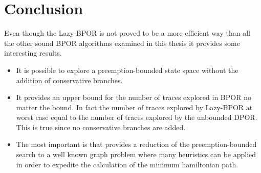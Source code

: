 
\section{Conclusion}
Even though the Lazy-BPOR is not proved to be a more efficient way than all the other sound BPOR algorithms examined in this thesis it
provides some interesting results.

\begin{itemize}
    \item It is possible to explore a preemption-bounded state space without the addition of conservative branches.
    \item It provides an upper bound for the number of traces explored in BPOR no matter the bound. In fact the number of traces
    explored by Lazy-BPOR at worst case equal to the number of traces explored by the unbounded DPOR. This is true since no conservative
    branches are added.
    \item The most important is that provides a reduction of the preemption-bounded search to a well known graph problem where many heuristics can
    be applied in order to expedite the calculation of the minimum hamiltonian path.
\end{itemize}

